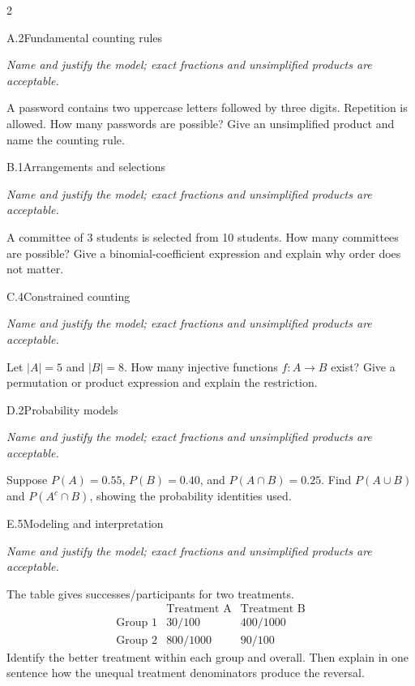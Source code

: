 \documentclass[9pt]{extarticle}
\begin{document}
\begin{multicols}{2}
\begin{CoreProblem}{A.2}{Fundamental counting rules}
{\scriptsize\textit{Name and justify the model; exact fractions and unsimplified products are acceptable.}\par}
A password contains two uppercase letters followed by three digits.
    Repetition is allowed. How many passwords are possible? Give an unsimplified
    product and name the counting rule.
\end{CoreProblem}
\begin{CoreProblem}{B.1}{Arrangements and selections}
{\scriptsize\textit{Name and justify the model; exact fractions and unsimplified products are acceptable.}\par}
A committee of 3 students is selected from 10 students. How many
    committees are possible? Give a binomial-coefficient expression and explain
    why order does not matter.
\end{CoreProblem}
\begin{CoreProblem}{C.4}{Constrained counting}
{\scriptsize\textit{Name and justify the model; exact fractions and unsimplified products are acceptable.}\par}
Let $|A|=5$ and $|B|=8$. How many injective functions $f:A\to B$
    exist? Give a permutation or product expression and explain the restriction.
\end{CoreProblem}
\columnbreak
\begin{CoreProblem}{D.2}{Probability models}
{\scriptsize\textit{Name and justify the model; exact fractions and unsimplified products are acceptable.}\par}
Suppose $P(A)=0.55$, $P(B)=0.40$, and $P(A\cap B)=0.25$. Find
    $P(A\cup B)$ and $P(A^c\cap B)$, showing the probability identities used.
\end{CoreProblem}
\begin{CoreProblem}{E.5}{Modeling and interpretation}
{\scriptsize\textit{Name and justify the model; exact fractions and unsimplified products are acceptable.}\par}
The table gives successes/participants for two treatments.
    \[
    \begin{array}{c|cc}
      &\text{Treatment A}&\text{Treatment B}\\\hline
      \text{Group 1}&30/100&400/1000\\
      \text{Group 2}&800/1000&90/100
    \end{array}
    \]
    Identify the better treatment within each group and overall. Then explain in
    one sentence how the unequal treatment denominators produce the reversal.
\end{CoreProblem}
\end{multicols}
\end{document}
